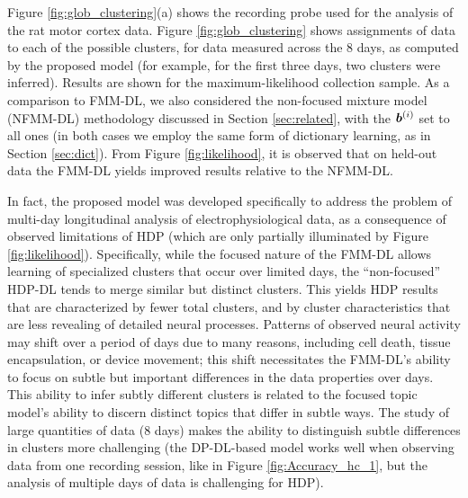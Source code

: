 \documentclass[journal]{IEEEtran}
\begin{document}
{Figure }\ref{fig:glob_clustering}{(a) shows the recording probe used for the analysis of the rat motor cortex data.}  Figure \ref{fig:glob_clustering} {shows} assignments of data to each of the possible clusters, for data measured across the 8 days, as computed by the proposed model (for example, for the first three days, two clusters were inferred). Results are shown for the maximum-likelihood collection sample. As a comparison to {FMM-DL,} 
we also considered the {non-focused mixture model (NFMM-DL)} methodology discussed in Section \ref{sec:related}, with the $\boldsymbol{b}^{(i)}$ set to all ones (in both cases we employ the same form of dictionary learning, as in Section \ref{sec:dict}). From Figure \ref{fig:likelihood}, it is observed that on held-out data the FMM{-DL} yields improved results relative to the {NFMM-DL}.

In fact, the proposed model was developed specifically to address the problem of multi-day {longitudinal} analysis of electrophysiological data, as a consequence of observed limitations of HDP (which are only partially illuminated by Figure \ref{fig:likelihood}). Specifically, while the focused nature of the FMM{-DL} allows learning of specialized clusters that occur over limited days, the ``non-focused'' HDP{-DL} tends to merge similar but distinct clusters. This yields HDP results that are characterized by fewer total clusters, and by cluster characteristics that are less revealing of detailed neural processes. Patterns of observed neural activity may shift over a period of days due to many reasons, including cell death, tissue encapsulation, or device movement; this shift necessitates the FMM{-DL}'s ability to focus on subtle but important differences in the data properties over days. This ability to infer subtly different clusters is related to the focused topic model's ability  \cite{compound} to discern distinct topics that differ in subtle ways. The study of large quantities of data (8 days) makes the ability to distinguish subtle differences in clusters more challenging (the DP-DL-based model works well when observing data from one recording session, like in Figure \ref{fig:Accuracy_hc_1}, but the analysis of multiple days of data is challenging for HDP).
\end{document}
